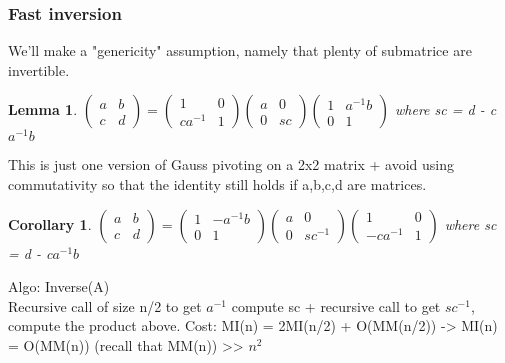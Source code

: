 \documentclass{article}
\newtheorem{lemma}{Lemma}
\newtheorem{corollary}{Corollary}
\theoremstyle{definition}
\theoremstyle{remark}
\begin{document}
\subsubsection{Fast inversion}
We'll make a "genericity" assumption, namely that plenty of submatrice are invertible.
\begin{lemma}
	 $\begin{pmatrix}
	 a&b\\c&d
	 \end{pmatrix} = 
	 \begin{pmatrix}
	 	1&0\\ca^{-1}&1
	 \end{pmatrix}
	  \begin{pmatrix}
	  a&0\\0&sc
	  \end{pmatrix}
	   \begin{pmatrix}
	   	1&a^{-1}b\\0&1
	   \end{pmatrix}$ where sc = d - c$a^{-1}b$
\end{lemma}
This is just one version of Gauss pivoting on a 2x2 matrix + avoid using commutativity so that the identity still holds if a,b,c,d are matrices.

\begin{corollary}
	$\begin{pmatrix}
	a&b\\c&d
	\end{pmatrix} = 
	\begin{pmatrix}
	1&-a^{-1}b\\0&1
	\end{pmatrix}
	\begin{pmatrix}
	a&0\\0&sc^{-1}
	\end{pmatrix}
	\begin{pmatrix}
	1&0\\-ca^{-1}&1
	\end{pmatrix}$ where sc = d - c$a^{-1}b$
\end{corollary}
Algo: Inverse(A)\\
Recursive call of size n/2 to get $a^{-1}$ compute sc + recursive call to get $sc^{-1}$, compute the product above.
Cost: MI(n) = 2MI(n/2) + O(MM(n/2)) -> MI(n) = O(MM(n)) (recall that MM(n)) >> $n^2$
\end{document}
